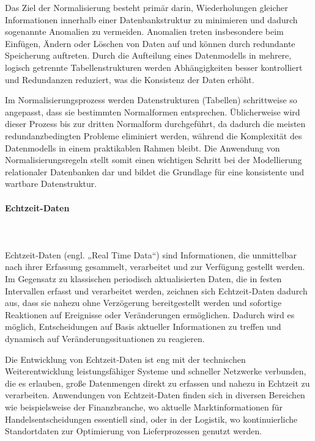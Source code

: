 Das Ziel der Normalisierung besteht primär darin, Wiederholungen gleicher Informationen innerhalb einer Datenbankstruktur zu minimieren und dadurch sogenannte Anomalien zu vermeiden. Anomalien treten insbesondere beim Einfügen, Ändern oder Löschen von Daten auf und können durch redundante Speicherung auftreten. Durch die Aufteilung eines Datenmodells in mehrere, logisch getrennte Tabellenstrukturen werden Abhängigkeiten besser kontrolliert und Redundanzen reduziert, was die Konsistenz der Daten erhöht.

Im Normalisierungsprozess werden Datenstrukturen (Tabellen) schrittweise so angepasst, dass sie bestimmten Normalformen entsprechen. Üblicherweise wird dieser Prozess bis zur dritten Normalform durchgeführt, da dadurch die meisten redundanzbedingten Probleme eliminiert werden, während die Komplexität des Datenmodells in einem praktikablen Rahmen bleibt. Die Anwendung von Normalisierungsregeln stellt somit einen wichtigen Schritt bei der Modellierung relationaler Datenbanken dar und bildet die Grundlage für eine konsistente und wartbare Datenstruktur.

\paragraph{Echtzeit-Daten}
\mbox{}\\
\mbox{}\\
Echtzeit‑Daten (engl. „Real Time Data“) sind Informationen, die unmittelbar nach ihrer Erfassung gesammelt, verarbeitet und zur Verfügung gestellt werden. Im Gegensatz zu klassischen periodisch aktualisierten Daten, die in festen Intervallen erfasst und verarbeitet werden, zeichnen sich Echtzeit‑Daten dadurch aus, dass sie nahezu ohne Verzögerung bereitgestellt werden und sofortige Reaktionen auf Ereignisse oder Veränderungen ermöglichen. Dadurch wird es möglich, Entscheidungen auf Basis aktueller Informationen zu treffen und dynamisch auf Veränderungssituationen zu reagieren.\cite{medienpalast_realtime_data}

Die Entwicklung von Echtzeit‑Daten ist eng mit der technischen Weiterentwicklung leistungsfähiger Systeme und schneller Netzwerke verbunden, die es erlauben, große Datenmengen direkt zu erfassen und nahezu in Echtzeit zu verarbeiten. Anwendungen von Echtzeit‑Daten finden sich in diversen Bereichen wie beispielsweise der Finanzbranche, wo aktuelle Marktinformationen für Handelsentscheidungen essentiell sind, oder in der Logistik, wo kontinuierliche Standortdaten zur Optimierung von Lieferprozessen genutzt werden.

